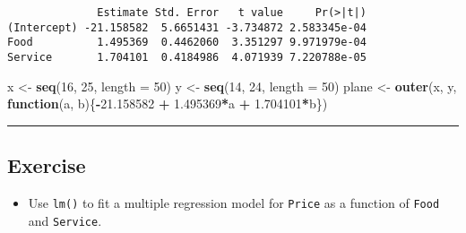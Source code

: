 \documentclass[
]{book}
\newenvironment{Shaded}{\begin{snugshade}}{\end{snugshade}}
\newcommand{\ControlFlowTok}[1]{\textcolor[rgb]{0.13,0.29,0.53}{\textbf{#1}}}
\newcommand{\DataTypeTok}[1]{\textcolor[rgb]{0.13,0.29,0.53}{#1}}
\newcommand{\DecValTok}[1]{\textcolor[rgb]{0.00,0.00,0.81}{#1}}
\newcommand{\FloatTok}[1]{\textcolor[rgb]{0.00,0.00,0.81}{#1}}
\newcommand{\KeywordTok}[1]{\textcolor[rgb]{0.13,0.29,0.53}{\textbf{#1}}}
\newcommand{\NormalTok}[1]{#1}
\newcommand{\OperatorTok}[1]{\textcolor[rgb]{0.81,0.36,0.00}{\textbf{#1}}}
\newcommand{\StringTok}[1]{\textcolor[rgb]{0.31,0.60,0.02}{#1}}
\providecommand{\tightlist}{%
  \setlength{\itemsep}{0pt}\setlength{\parskip}{0pt}}
\begin{document}
\begin{Shaded}
\end{Shaded}

\begin{verbatim}
              Estimate Std. Error   t value     Pr(>|t|)
(Intercept) -21.158582  5.6651431 -3.734872 2.583345e-04
Food          1.495369  0.4462060  3.351297 9.971979e-04
Service       1.704101  0.4184986  4.071939 7.220788e-05
\end{verbatim}

\begin{Shaded}
\begin{Highlighting}[]
\NormalTok{x <-}\StringTok{ }\KeywordTok{seq}\NormalTok{(}\DecValTok{16}\NormalTok{, }\DecValTok{25}\NormalTok{, }\DataTypeTok{length =} \DecValTok{50}\NormalTok{)}
\NormalTok{y <-}\StringTok{ }\KeywordTok{seq}\NormalTok{(}\DecValTok{14}\NormalTok{, }\DecValTok{24}\NormalTok{, }\DataTypeTok{length =} \DecValTok{50}\NormalTok{)}
\NormalTok{plane <-}\StringTok{ }\KeywordTok{outer}\NormalTok{(x, y, }\ControlFlowTok{function}\NormalTok{(a, b)\{}\OperatorTok{-}\FloatTok{21.158582} \OperatorTok{+}\StringTok{ }\FloatTok{1.495369}\OperatorTok{*}\NormalTok{a }\OperatorTok{+}\StringTok{ }\FloatTok{1.704101}\OperatorTok{*}\NormalTok{b\})}
\end{Highlighting}
\end{Shaded}

\begin{center}\rule{0.5\linewidth}{0.5pt}\end{center}

\hypertarget{exercise-22}{%
\subsection*{Exercise}\label{exercise-22}}

\begin{itemize}
\tightlist
\item
  Use \texttt{lm()} to fit a multiple regression model for \texttt{Price} as a function of \texttt{Food} and \texttt{Service}.
\end{itemize}
\end{document}
